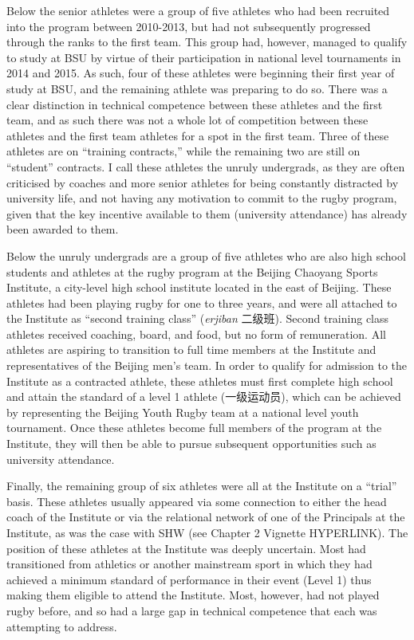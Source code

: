 

  Below the senior athletes were a group of five athletes who had been recruited into the program between 2010-2013, but had not subsequently progressed through the ranks to the first team. This group had, however, managed to qualify to study at BSU by virtue of their participation in national level tournaments in 2014 and 2015. As such, four of these athletes were beginning their first year of study at BSU, and the remaining athlete was preparing to do so. There was a clear distinction in technical competence between these athletes and the first team, and as such there was not a whole lot of competition between these athletes and the first team athletes for a spot in the first team.  Three of these athletes are on ``training contracts,'' while the remaining two are still on ``student'' contracts.  I call these athletes the unruly undergrads, as they are often criticised by coaches and more senior athletes for being constantly distracted by university life, and not having any motivation to commit to the rugby program, given that the key incentive available to them (university attendance) has already been awarded to them.



  Below the unruly undergrads are a group of five athletes who are also high school students and athletes at the rugby program at the Beijing Chaoyang Sports Institute, a city-level high school institute located in the east of Beijing.  These athletes had been playing rugby for one to three years, and were all attached to the Institute as ``second training class'' (\textit{erjiban} 二级班).  Second training class athletes received coaching, board, and food, but no form of remuneration.  All athletes are aspiring to transition to full time members at the Institute and representatives of the Beijing men's team.  In order to qualify for admission to the Institute as a contracted athlete, these athletes must first complete high school and attain the standard of a level 1 athlete (一级运动员), which can be achieved by representing the Beijing Youth Rugby team at a national level youth tournament.  Once these athletes become full members of the program at the Institute, they will then be able to pursue subsequent opportunities such as university attendance.

  Finally, the remaining group of six athletes were all at the Institute on a ``trial'' basis.  These athletes usually appeared via some connection to either the head coach of the Institute or via the relational network of one of the Principals at the Institute, as was the case with SHW (see Chapter 2 Vignette HYPERLINK). The position of these athletes at the Institute was deeply uncertain.  Most had transitioned from athletics or another mainstream sport in which they had achieved a minimum standard of performance in their event (Level 1) thus making them eligible to attend the Institute.  Most, however, had not played rugby before, and so had a large gap in technical competence that each was attempting to address.


